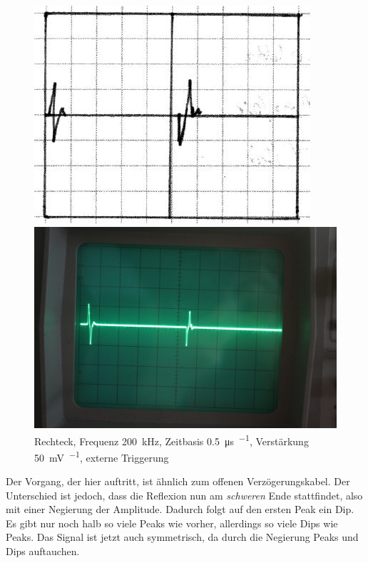 \begin{figure}[htbp]
	\centering
	\begin{minipage}{.45\linewidth}
	\includegraphics[width=\linewidth]{Skizzen/IMG_0768-1500.jpg}
	\end{minipage}
	\hfill
	\begin{minipage}{.45\linewidth}
	\includegraphics[width=\linewidth]{Fotos/IMG_0768-1500.jpg}
	\end{minipage}
	\caption{%
		Rechteck, Frequenz \SI{200}{\kilo\hertz},
		Zeitbasis \SI{.5}{\micro\second\per\division},
		Verstärkung \SI{50}{\milli\volt\per\division},
		externe Triggerung
	}
	\label{fig:0768}
\end{figure}

Der Vorgang, der hier auftritt, ist ähnlich zum offenen Verzögerungskabel. Der
Unterschied ist jedoch, dass die Reflexion nun am \emph{schweren} Ende
stattfindet, also mit einer Negierung der Amplitude. Dadurch folgt auf den
ersten Peak ein Dip. Es gibt nur noch halb so viele Peaks wie vorher,
allerdings so viele Dips wie Peaks. Das Signal ist jetzt auch symmetrisch, da
durch die Negierung Peaks und Dips auftauchen.

